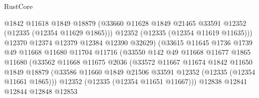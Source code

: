 \begin{lexlean}{RustCore}
\begin{coremodule}
                                  @1842
                                  @11618
                                  @1849
                                  @18879
                                  (@33660
                                    @11628
                                    @1849
                                    @21465
                                    @33591
                                    @12352
                                    (@12335 (@12354 @11629 @1865)))
                                  @12352
                                  (@12335 (@12354 @11619 @11635)))
                                @12370
                                @12374
                                @12379
                                @12384
                                @12390
                                @32629)
                              (@33615
                                @11645
                                @1736
                                @1739
                                @49
                                @11668
                                @11680
                                @11704
                                @11716
                                (@33550
                                  @142
                                  @49
                                  @11668
                                  @11677
                                  @1865
                                  @11680
                                  (@33562
                                    @11668
                                    @11675
                                    @2036
                                    (@33572
                                      @11667
                                      @11674
                                      @1842
                                      @11650
                                      @1849
                                      @18879
                                      (@33586
                                        @11660
                                        @1849
                                        @21506
                                        @33591
                                        @12352
                                        (@12335 (@12354 @11661 @1865)))
                                      @12352
                                      (@12335 (@12354 @11651 @11667)))
                                    @12838
                                    @12841
                                    @12844
                                    @12848
                                    @12853

\end{coremodule}
\end{lexlean}
